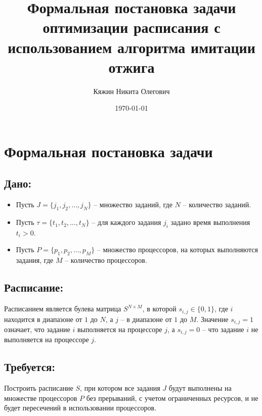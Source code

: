\documentclass{article}
\begin{document}
    \title{\textbf{Формальная постановка задачи оптимизации расписания с использованием алгоритма имитации отжига}}
    \author{Кяжин Никита Олегович}
    \date{\today}
    \maketitle

    \newpage
    \pagestyle{fancy}
    \fancyhf{}
    \rhead{\thepage}

    \section*{Формальная постановка задачи}
        
        \subsection*{Дано:}
            \begin{itemize}
                \item Пусть $J = \{j_1, j_2, \dots, j_N\}$ -- множество заданий, где $N$ -- количество заданий.
                \item Пусть $\tau  = \{t_1, t_2, \dots, t_N\}$ -- для каждого задания $j_i$ задано время выполнения $t_i > 0$.
                \item Пусть $P = \{p_1, p_2, \dots, p_M\}$ -- множество процессоров, на которых выполняются задания, где $M$ -- количество процессоров.
            \end{itemize}
        
        \subsection*{Расписание:}
            Расписанием является булева матрица $S^{N \times M}$, в которой $s_{i,j} \in \{0, 1\}$, где $i$ находится в диапазоне от $1$ до $N$, а $j$ -- в диапазоне от $1$ до $M$. Значение $s_{i,j} = 1$ означает,
            что задание $i$ выполняется на процессоре $j$, а $s_{i,j} = 0$ -- что задание $i$ не выполняется на процессоре $j$.
            

        \subsection*{Требуется:}

                Построить расписание $S$, при котором все задания $J$ будут выполнены на множестве процессоров $P$ без прерываний, с учетом ограниченных ресурсов, и не будет пересечений в использовании процессоров.
\end{document}
